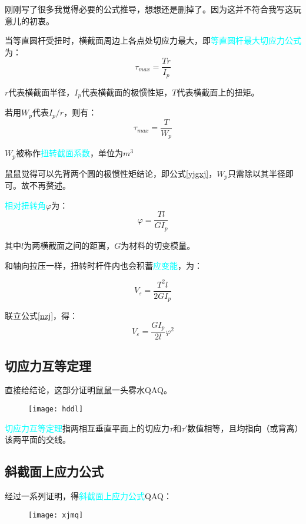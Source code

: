 \documentclass[10pt,a4paper]{ctexart}
\begin{document}
刚刚写了很多我觉得必要的公式推导，想想还是删掉了。因为这并不符合我写这玩意儿的初衷。

当等直圆杆受扭时，横截面周边上各点处切应力最大，即\textcolor{cyan}{等直圆杆最大切应力公式}为：
\begin{equation}
	\tau_{max}=\frac{Tr}{I_p}
\end{equation}

$r$代表横截面半径，$I_p$代表横截面的极惯性矩，$T$代表横截面上的扭矩。

若用$W_p$代表$I_p/r$，则有：
\begin{equation}
\tau_{max}=\frac{T}{W_p}
\end{equation}

$W_p$被称作\textcolor{cyan}{扭转截面系数}，单位为$m^3$

鼠鼠觉得可以先背两个圆的极惯性矩结论，即公式\ref{yjgxj}，$W_p$只需除以其半径即可。故不再赘述。

\textcolor{cyan}{相对扭转角}$\varphi$为：
\begin{equation}
	\varphi=\frac{Tl}{GI_p}
	\label{nzj}
\end{equation}

其中$l$为两横截面之间的距离，$G$为材料的切变模量。

和轴向拉压一样，扭转时杆件内也会积蓄\textcolor{cyan}{应变能}，为：

\begin{equation}
	V_\varepsilon=\frac{T^2l}{2GI_p}
\end{equation}

联立公式\ref{nzj}，得：
\begin{equation}
	V_\varepsilon=\frac{GI_p}{2l}\varphi^2
\end{equation}

\subsection{切应力互等定理}
直接给结论，这部分证明鼠鼠一头雾水QAQ。
\begin{figure}[htp]%
	\centering
	\texttt{[image: hddl]}
\end{figure}

\textcolor{cyan}{切应力互等定理}指两相互垂直平面上的切应力$\tau$和$\tau'$数值相等，且均指向（或背离）该两平面的交线。

\subsection{斜截面上应力公式}
经过一系列证明，得\textcolor{cyan}{斜截面上应力公式}QAQ：
\begin{figure}[htp]%
	\centering
	\texttt{[image: xjmq]}
\end{figure}
\end{document}
